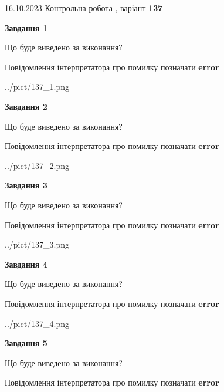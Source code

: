 \documentclass[12pt, ukrainian]{article}
\begin{document}
{\Large{16.10.2023 Контрольна робота , варіант  \No \textbf { 137 }\par}}
{
\begin {large}
{\begin {center}\textbf{Завдання 1}\end {center}}\par
Що буде виведено за виконання? \par
Повідомлення інтерпретатора про помилку позначати \textbf{error}

\begin{center}
	{../pict/137_1.png}
\end{center}
\newpage

{\begin {center}\textbf{Завдання 2}\end {center}}\par
Що буде виведено за виконання? \par
Повідомлення інтерпретатора про помилку позначати \textbf{error}

\begin{center}
	{../pict/137_2.png}
\end{center}
\newpage

{\begin {center}\textbf{Завдання 3}\end {center}}\par
Що буде виведено за виконання? \par
Повідомлення інтерпретатора про помилку позначати \textbf{error}

\begin{center}
	{../pict/137_3.png}
\end{center}
\newpage

{\begin {center}\textbf{Завдання 4}\end {center}}\par
Що буде виведено за виконання? \par
Повідомлення інтерпретатора про помилку позначати \textbf{error}

\begin{center}
	{../pict/137_4.png}
\end{center}
\newpage

{\begin {center}\textbf{Завдання 5}\end {center}}\par
Що буде виведено за виконання? \par
Повідомлення інтерпретатора про помилку позначати \textbf{error}


\end{large}}
\end{document}

